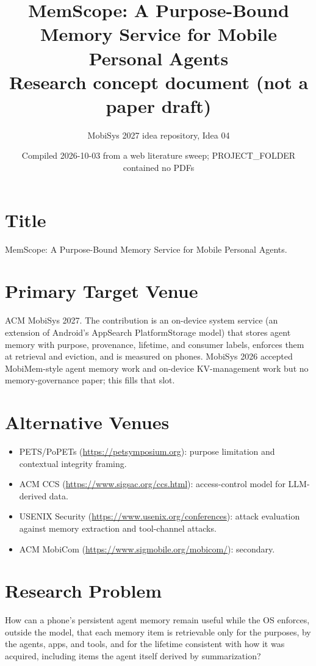 \documentclass[11pt]{article}
\title{MemScope: A Purpose-Bound Memory Service for Mobile Personal Agents\\
\large Research concept document (not a paper draft)}
\author{MobiSys 2027 idea repository, Idea 04}
\date{Compiled 2026-10-03 from a web literature sweep; PROJECT\_FOLDER contained no PDFs}
\begin{document}
\maketitle

\section{Title}
MemScope: A Purpose-Bound Memory Service for Mobile Personal Agents.

\section{Primary Target Venue}
ACM MobiSys 2027. The contribution is an on-device system service (an extension of Android's AppSearch PlatformStorage model) that stores agent memory with purpose, provenance, lifetime, and consumer labels, enforces them at retrieval and eviction, and is measured on phones. MobiSys 2026 accepted MobiMem-style agent memory work and on-device KV-management work but no memory-governance paper; this fills that slot.

\section{Alternative Venues}
\begin{itemize}
  \item PETS/PoPETs (\url{https://petsymposium.org}): purpose limitation and contextual integrity framing.
  \item ACM CCS (\url{https://www.sigsac.org/ccs.html}): access-control model for LLM-derived data.
  \item USENIX Security (\url{https://www.usenix.org/conferences}): attack evaluation against memory extraction and tool-channel attacks.
  \item ACM MobiCom (\url{https://www.sigmobile.org/mobicom/}): secondary.
\end{itemize}

\section{Research Problem}
How can a phone's persistent agent memory remain useful while the OS enforces, outside the model, that each memory item is retrievable only for the purposes, by the agents, apps, and tools, and for the lifetime consistent with how it was acquired, including items the agent itself derived by summarization?
\end{document}
